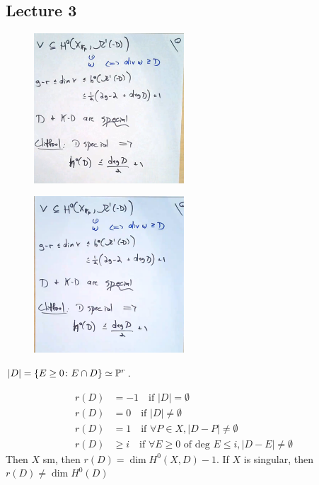\newpage
\subsection{Lecture 3}

	\begin{figure}[!ht]
	\centering
	\includegraphics[width=0.5\textwidth]{../images/im17.png}
	\end{figure}
	
	\begin{figure}[!ht]
	\centering
	\includegraphics[width=0.5\textwidth]{../images/im18.png}
	\end{figure}
	
$|D|= \{ E \geq 0 \colon E \cap D \} \simeq \P^r$.

	\[
	\begin{aligned}
	r(D)&= -1 \quad \text{if } |D|= \emptyset \\
	r(D)&= 0 \quad \text{if } |D|\neq \emptyset \\
	r(D)&= 1 \quad \text{if } \forall P \in X, |D - P| \neq \emptyset \\
	r(D)&\geq i \quad \text{if } \forall E \geq 0 \text{ of deg }E \leq i, |D - E|\neq \emptyset 
	\end{aligned}
	\]
Then $X$ sm, then $r(D)= \dim H^0(X,D)-1$. If $X$ is singular, then $r(D) \neq \dim H^0(D)$



